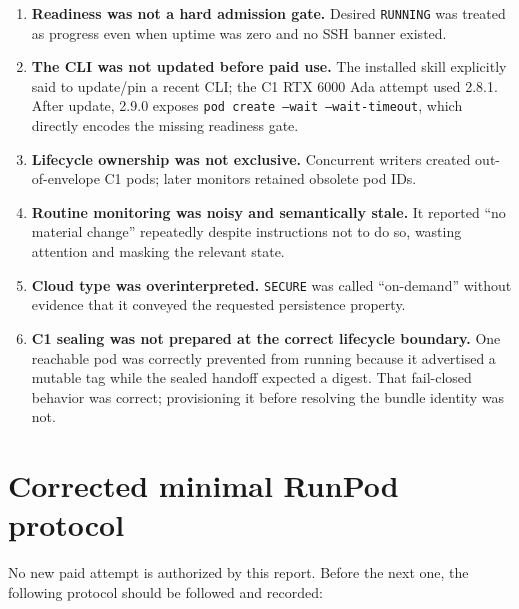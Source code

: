 \documentclass[10pt]{article}
\begin{document}
\begin{enumerate}[leftmargin=1.5em]
\item \textbf{Readiness was not a hard admission gate.} Desired \texttt{RUNNING}
  was treated as progress even when uptime was zero and no SSH banner existed.
\item \textbf{The CLI was not updated before paid use.} The installed skill
  explicitly said to update/pin a recent CLI; the C1 RTX 6000 Ada attempt used
  2.8.1.  After update, 2.9.0 exposes \texttt{pod create --wait --wait-timeout},
  which directly encodes the missing readiness gate.
\item \textbf{Lifecycle ownership was not exclusive.} Concurrent writers
  created out-of-envelope C1 pods; later monitors retained obsolete pod IDs.
\item \textbf{Routine monitoring was noisy and semantically stale.} It
  reported ``no material change'' repeatedly despite instructions not to do
  so, wasting attention and masking the relevant state.
\item \textbf{Cloud type was overinterpreted.} \texttt{SECURE} was called
  ``on-demand'' without evidence that it conveyed the requested persistence
  property.
\item \textbf{C1 sealing was not prepared at the correct lifecycle boundary.}
  One reachable pod was correctly prevented from running because it advertised
  a mutable tag while the sealed handoff expected a digest. That fail-closed
  behavior was correct; provisioning it before resolving the bundle identity
  was not.
\end{enumerate}

\section*{Corrected minimal RunPod protocol}

No new paid attempt is authorized by this report.  Before the next one, the
following protocol should be followed and recorded:
\end{document}
